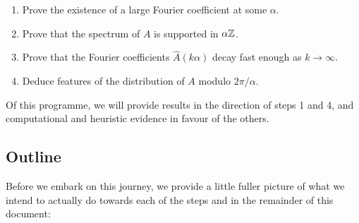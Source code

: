 \documentclass{article}
\theoremstyle{definition}
\theoremstyle{remark}
\numberwithin{equation}{section}
\begin{document}
\begin{enumerate}
  \item Prove the existence of a large Fourier coefficient at
    some $\alpha$.
  \item Prove that the spectrum of $A$ is supported in $\alpha \mathbb{Z}$.  
  \item Prove that the Fourier coefficients $\widehat{A}(k\alpha)$
    decay fast enough as $k \to \infty$.  
  \item Deduce features of the distribution of $A$ modulo
    $2\pi/\alpha$.
\end{enumerate}

Of this programme, we will provide results in the direction of steps 1
and 4, and computational and heuristic evidence in favour of the
others.

\subsection{Outline}

Before we embark on this journey, we provide a little fuller picture
of what we intend to actually do towards each of the steps and in the
remainder of this document: 
\end{document}
